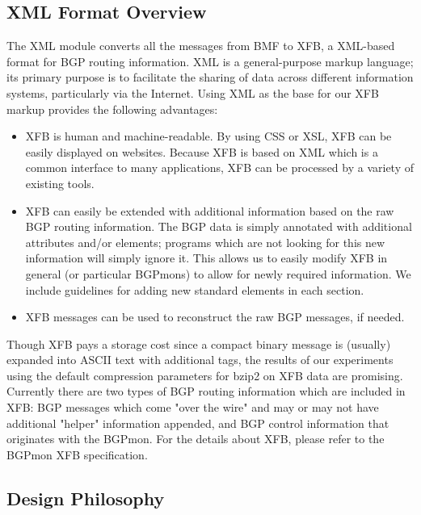 \subsection{XML Format Overview}
The XML module converts all the messages from BMF to XFB, a XML-based format for BGP routing information. XML is a general-purpose markup language; its primary purpose is to facilitate the sharing of data across different information systems, particularly via the Internet. Using XML as the base for our XFB markup provides the following advantages:

  \begin{itemize}
  \item{ XFB is human and machine-readable. By using CSS or XSL, XFB can be easily displayed on websites. Because XFB is based on XML which is a common interface to many applications, XFB can be processed by a variety of existing tools. }

   \item{XFB can easily be extended with additional information based on the raw BGP routing information. The BGP data is simply annotated with additional attributes and/or elements; programs which are not looking for this new information will simply ignore it. This allows us to easily modify XFB in general (or particular BGPmons) to allow for newly required information. We include guidelines for adding new standard elements in each section.}

    \item{XFB messages can be used to reconstruct the raw BGP messages, if needed. }
  \end{itemize}
Though XFB pays a storage cost since a compact binary message is (usually) expanded into ASCII text with additional tags, the results of our experiments using the default compression parameters for bzip2 on XFB data are promising.  Currently there are two types of BGP routing information which are included in XFB: BGP messages which come "over the wire" and may or may not have additional "helper" information appended, and BGP control information that originates with the BGPmon. 
For the details about XFB, please refer to the BGPmon XFB specification.

\subsection{Design Philosophy}

